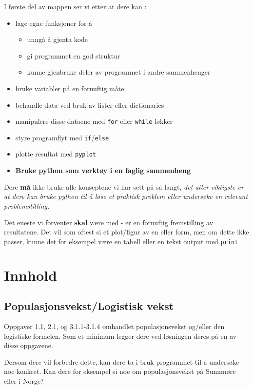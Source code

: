 \documentclass[12pt, titlepage]{article}
\begin{document}
I første del av mappen ser vi etter at dere kan : 
\begin{itemize}
  \item {lage egne funksjoner for å }
     \begin{itemize}
        \item {unngå å gjenta kode}
        \item {gi programmet en god struktur}
        \item {kunne gjenbruke deler av programmet i andre sammenhenger}
     \end{itemize}
  \item {bruke variabler på en fornuftig måte}
  \item {behandle data ved bruk av lister eller dictionaries}
  \item {manipulere disse dataene med \texttt{for} eller \texttt{while} løkker}
  \item {styre programflyt med \texttt{if}/\texttt{else}}
  \item {plotte resultat med \texttt{pyplot}}
  \item {\textbf{Bruke python som verktøy i en faglig sammenheng}}
\end{itemize}

Dere \textbf{må} ikke bruke alle konseptene vi har sett på så langt, \textit{det aller viktigste er at dere kan 
bruke python til å løse et praktisk problem eller undersøke en relevant problemstilling.}

Det eneste vi forventer \textbf{skal} være med - er en fornuftig fremstilling av resultatene.
Det vil som oftest si et plot/figur av en eller form, men om dette ikke passer, kunne det for eksempel
være en tabell eller en tekst output med \texttt{print} 

\section*{Innhold}

\subsection*{Populasjonsvekst/Logistisk vekst}
Oppgaver 1.1, 2.1, og 3.1.1-3.1.4 omhandlet populasjonsvekst og/eller den logistiske formelen.
Som et minimum legger dere ved løsningen deres på en av disse oppgavene.

Dersom dere vil forbedre dette, kan dere ta i bruk programmet til å undersøke noe konkret.
Kan dere for eksempel si noe om populasjonsvekst på Sunnmøre eller i Norge?
\end{document}
